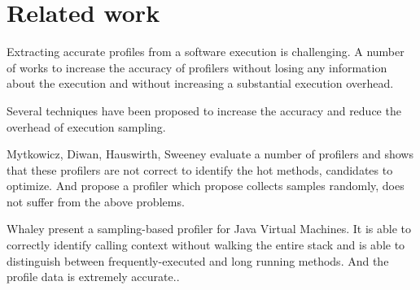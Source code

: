\documentclass{sig-alternate}
\newcommand{\ab}[1]{\nb{Alexandre}{blue}{#1}}
\newcommand{\seclabel}[1]{\label{sec:#1}}
\begin{document}
\section{Related work}\seclabel{relatedwork}

Extracting accurate profiles from a software execution is challenging. A number of works to increase the accuracy of profilers without losing any information about the execution and without increasing a substantial execution overhead.



Several techniques have been proposed to increase the accuracy and reduce the overhead of execution sampling.





Mytkowicz, Diwan, Hauswirth, Sweeney evaluate a number of profilers and shows that these profilers are not correct to identify the hot methods, candidates to optimize. And propose a profiler which  propose collects samples randomly, does not suffer from the above problems. 



Whaley present a sampling-based profiler for Java Virtual Machines. It is able to correctly identify calling context without walking the entire stack and is able to distinguish between frequently-executed and long running methods.  And the profile data is extremely accurate.\cite{Whaley:2000:PSP:337449.337483}. 
\end{document}
